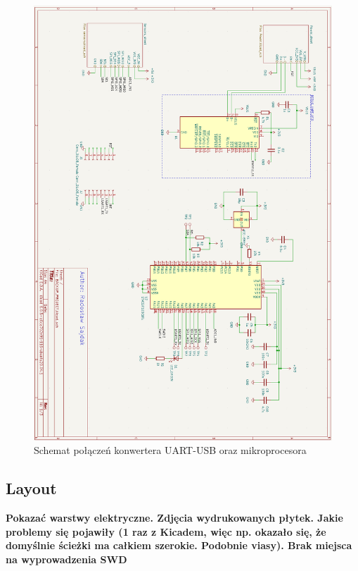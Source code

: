 \begin{figure}[H]
    \centering
    \includegraphics[width=\textwidth, height=\textheight, keepaspectratio]{Graphics/main_sch.png}
    \caption{Schemat połączeń konwertera UART-USB oraz mikroprocesora}
    \label{img:main_sch}
\end{figure}
\subsection{Layout}
\textbf{Pokazać warstwy elektryczne. Zdjęcia wydrukowanych płytek. Jakie problemy się pojawiły (1 raz z Kicadem, więc np. okazało się, że domyślnie ścieżki ma całkiem szerokie. Podobnie viasy). Brak miejsca na wyprowadzenia SWD}

